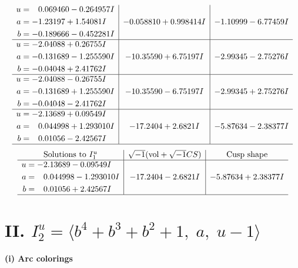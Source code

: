 \documentclass[1p]{elsarticle_modified}
\theoremstyle{definition}
\newcommand{\I}{\sqrt{-1}}
\begin{document}
$$\begin{array}{c|c|c}
\begin{aligned}
u &= \phantom{-}0.069460 - 0.264957 I \\
a &= -1.23197 + 1.54081 I \\
b &= -0.189666 - 0.452281 I\end{aligned}
 & -0.058810 + 0.998414 I & -1.10999 - 6.77459 I \\ \hline\begin{aligned}
u &= -2.04088 + 0.26755 I \\
a &= -0.131689 - 1.255590 I \\
b &= -0.04048 + 2.41762 I\end{aligned}
 & -10.35590 + 6.75197 I & -2.99345 - 2.75276 I \\ \hline\begin{aligned}
u &= -2.04088 - 0.26755 I \\
a &= -0.131689 + 1.255590 I \\
b &= -0.04048 - 2.41762 I\end{aligned}
 & -10.35590 - 6.75197 I & -2.99345 + 2.75276 I \\ \hline\begin{aligned}
u &= -2.13689 + 0.09549 I \\
a &= \phantom{-}0.044998 + 1.293010 I \\
b &= \phantom{-}0.01056 - 2.42567 I\end{aligned}
 & -17.2404 + 2.6821 I & -5.87634 - 2.38377 I\\
 \hline 
 \end{array}$$\newpage$$\begin{array}{c|c|c}  
\text{Solutions to }I^u_{1}& \I (\text{vol} + \sqrt{-1}CS) & \text{Cusp shape}\\
 \hline 
\begin{aligned}
u &= -2.13689 - 0.09549 I \\
a &= \phantom{-}0.044998 - 1.293010 I \\
b &= \phantom{-}0.01056 + 2.42567 I\end{aligned}
 & -17.2404 - 2.6821 I & -5.87634 + 2.38377 I\\
 \hline 
 \end{array}$$\newpage\newpage\renewcommand{\arraystretch}{1}
\centering \section*{II. $I^u_{2}= \langle b^4+b^3+b^2+1,\;a,\;u-1 \rangle$}
\flushleft \textbf{(i) Arc colorings}\\
\end{document}
